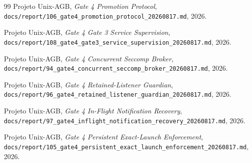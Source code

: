 \documentclass[11pt,a4paper]{article}
\begin{document}
\begin{thebibliography}{99}
Projeto Unix-AGB,
\emph{Gate 4 Promotion Protocol},
\texttt{docs/report/106\_gate4\_promotion\_protocol\_20260817.md}, 2026.

Projeto Unix-AGB,
\emph{Gate 4 Gate 3 Service Supervision},
\texttt{docs/report/108\_gate4\_gate3\_service\_supervision\_20260817.md}, 2026.

Projeto Unix-AGB,
\emph{Gate 4 Concurrent Seccomp Broker},
\texttt{docs/report/94\_gate4\_concurrent\_seccomp\_broker\_20260817.md}, 2026.

Projeto Unix-AGB,
\emph{Gate 4 Retained-Listener Guardian},
\texttt{docs/report/96\_gate4\_retained\_listener\_guardian\_20260817.md}, 2026.

Projeto Unix-AGB,
\emph{Gate 4 In-Flight Notification Recovery},
\texttt{docs/report/97\_gate4\_inflight\_notification\_recovery\_20260817.md}, 2026.

Projeto Unix-AGB,
\emph{Gate 4 Persistent Exact-Launch Enforcement},
\texttt{docs/report/105\_gate4\_persistent\_exact\_launch\_enforcement\_20260817.md}, 2026.

\end{thebibliography}
\end{document}
